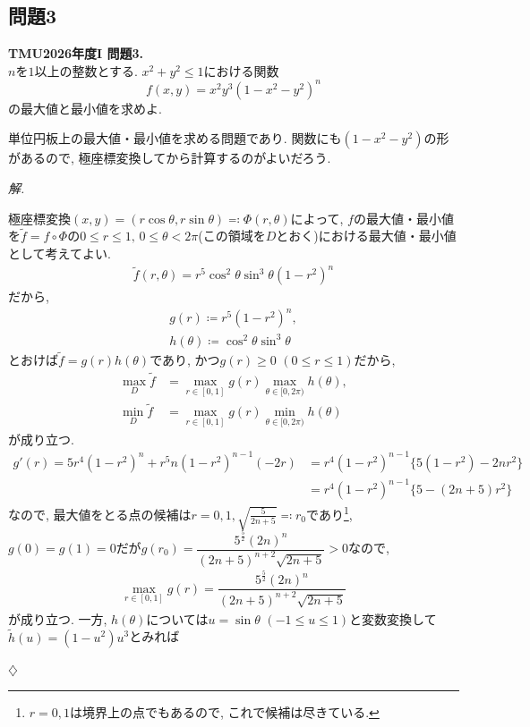 \documentclass[titlepage]{jsarticle}
\numberwithin{equation}{section}
\newenvironment{kaitou}[1][解]{%
\begin{proofbox}%
\textit{#1. }\ignorespaces
}{%
\hfill$\diamondsuit$%
\end{proofbox}%
}
\begin{document}
\subsection{問題3}
\begin{problem}
\textbf{TMU2026年度I 問題3.}\\
$n$を$1$以上の整数とする. $x^2+y^2\le 1$における関数
\[
f(x,y)=x^2y^3(1-x^2-y^2)^n
\]
の最大値と最小値を求めよ.
\end{problem}
単位円板上の最大値・最小値を求める問題であり. 関数にも$(1- x^2 -y^2)$の形があるので, 極座標変換してから計算するのがよいだろう.
\begin{kaitou}
極座標変換$(x, y) = (r\cos\theta, r\sin\theta) \eqcolon \Phi(r, \theta)$によって, $f$の最大値・最小値を$\tilde{f} = f \circ \Phi$の$0 \le r \le 1,\,0 \le \theta < 2\pi$(この領域を$D$とおく)における最大値・最小値として考えてよい.
\begin{align}
\tilde{f}(r, \theta) = r^5\cos^2\theta\sin^3\theta(1 - r^2)^n \label{eq:tmu2026-3e}
\end{align}
だから, 
\begin{align}
g(r) \coloneq r^5(1-r^2)^n,\\
h(\theta) \coloneq \cos^2\theta\sin^3\theta
\end{align}
とおけば$\tilde{f} = g(r)h(\theta)$であり, かつ$g(r) \ge 0\,\,(0 \le r \le 1)$だから, 
\begin{align}
\max_{D}\tilde{f} &= \max_{r \in [0, 1]}g(r) \max_{\theta \in [0, 2\pi)}h(\theta),\label{eq:tmu2026-3g}\\
\min_{D}\tilde{f} &= \max_{r \in [0, 1]}g(r) \min_{\theta \in [0, 2\pi)}h(\theta) \label{eq:tmu2026-3h}
\end{align}
が成り立つ. 
\begin{align*}
g'(r) = 5r^4(1 - r^2)^n + r^5n(1 - r^2)^{n-1}(-2r) &= r^4(1 - r^2)^{n-1}\{5(1 - r^2) - 2nr^2\}\\
&= r^4(1-r^2)^{n-1}\{5 - (2n+5)r^2\}
\end{align*}
なので, 最大値をとる点の候補は$r = 0, 1, \sqrt{\frac{5}{2n + 5}} \eqcolon r_0$であり\footnote{$r = 0, 1$は境界上の点でもあるので, これで候補は尽きている.}, $g(0) = g(1) = 0$だが$g(r_0) = \dfrac{5^{\frac{5}{2}}(2n)^n}{(2n + 5)^{n+2}\sqrt{2n + 5}} > 0$なので, 
\begin{align}
\max_{r \in [0, 1]} g(r) = \dfrac{5^{\frac{5}{2}}(2n)^n}{(2n + 5)^{n+2}\sqrt{2n + 5}}\label{eq:tmu2026-3i}
\end{align}
が成り立つ. 一方, $h(\theta)$については$u = \sin\theta\,\,(-1 \le u \le 1)$と変数変換して$\tilde{h}(u) = (1 - u^2)u^3$とみれば

\end{kaitou}
\end{document}
